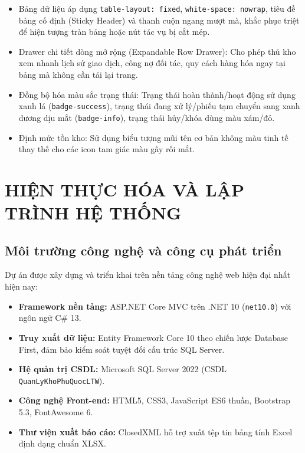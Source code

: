 \documentclass[12pt,a4paper]{report}
\renewcommand{\_}{\textunderscore\allowbreak}
\begin{document}
\begin{itemize}
    \begin{itemize}
        \item Bảng dữ liệu áp dụng \texttt{table-layout: fixed}, \texttt{white-space: nowrap}, tiêu đề bảng cố định (Sticky Header) và thanh cuộn ngang mượt mà, khắc phục triệt để hiện tượng tràn bảng hoặc nút tác vụ bị cắt mép.
        \item Drawer chi tiết dòng mở rộng (Expandable Row Drawer): Cho phép thủ kho xem nhanh lịch sử giao dịch, công nợ đối tác, quy cách hàng hóa ngay tại bảng mà không cần tải lại trang.
        \item Đồng bộ hóa màu sắc trạng thái: Trạng thái hoàn thành/hoạt động sử dụng xanh lá (\texttt{badge-success}), trạng thái đang xử lý/phiếu tạm chuyển sang xanh dương dịu mắt (\texttt{badge-info}), trạng thái hủy/khóa dùng màu xám/đỏ.
        \item Định mức tồn kho: Sử dụng biểu tượng mũi tên cơ bản không màu tinh tế thay thế cho các icon tam giác màu gây rối mắt.
    \end{itemize}
\end{itemize}

\cleardoublepage

\chapter{HIỆN THỰC HÓA VÀ LẬP TRÌNH HỆ THỐNG}

\section{Môi trường công nghệ và công cụ phát triển}
Dự án được xây dựng và triển khai trên nền tảng công nghệ web hiện đại nhất hiện nay:
\begin{itemize}
    \item \textbf{Framework nền tảng:} ASP.NET Core MVC trên .NET 10 (\texttt{net10.0}) với ngôn ngữ C\# 13.
    \item \textbf{Truy xuất dữ liệu:} Entity Framework Core 10 theo chiến lược Database First, đảm bảo kiểm soát tuyệt đối cấu trúc SQL Server.
    \item \textbf{Hệ quản trị CSDL:} Microsoft SQL Server 2022 (CSDL \texttt{QuanLyKhoPhuQuocLTW}).
    \item \textbf{Công nghệ Front-end:} HTML5, CSS3, JavaScript ES6 thuần, Bootstrap 5.3, FontAwesome 6.
    \item \textbf{Thư viện xuất báo cáo:} ClosedXML hỗ trợ xuất tệp tin bảng tính Excel định dạng chuẩn XLSX.
\end{itemize}
\end{document}
